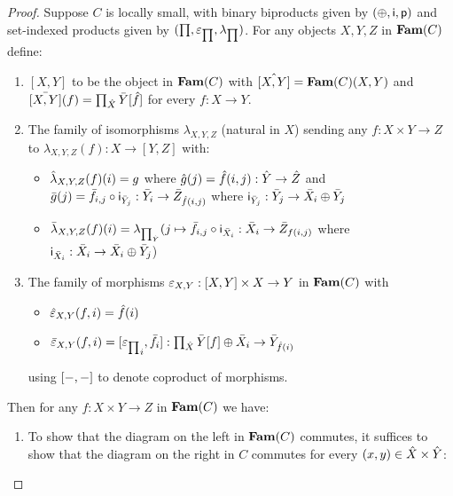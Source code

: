 \begin{proof}
Suppose $C$ is locally small, with binary biproducts given by $(\oplus,\mathsf{i},\mathsf{p})$ and set-indexed products
given by $(\prod,\varepsilon_{\prod},\lambda_{\prod})$. For any objects $X, Y, Z$ in $\mathbf{Fam}(C)$ define:

\begin{enumerate}
\item $[X, Y]$ to be the object in $\mathbf{Fam}(C)$ with $\hat{[X,Y]} = \mathbf{Fam}(C)(X,Y)$ and $\bar{[X, Y]}(f) =
\prod_{\hat{X}}\bar{Y}[\hat{f}]$ for every $f: X \to Y$.
\item The family of isomorphisms $\lambda_{X,Y,Z}$ (natural in $X$) sending any $f: X \times Y \to Z$ to
$\lambda_{X,Y,Z}(f): X \to [Y, Z]$ with:
\begin{itemize}
\item $\hat{\lambda}_{X,Y,Z}(f)(i) = g$ where $\hat{g}(j) = \hat{f}(i, j): \hat{Y} \to \hat{Z}$ and
$\bar{g}(j) = \bar{f}_{i,j} \circ \mathsf{i}_{\bar{Y}_j}: \bar{Y}_i \to \bar{Z}_{\hat{f}(i, j)}$ where
$\mathsf{i}_{\bar{Y}_j}: \bar{Y}_j \to \bar{X}_i \oplus \bar{Y}_j$
\item $\bar{\lambda}_{X,Y,Z}(f)(i) = \lambda_{\prod_{\hat{Y}}}(j \mapsto \bar{f}_{i, j} \circ
\mathsf{i}_{\bar{X}_i}: \bar{X}_i \to \bar{Z}_{f(i,j)}$ where $\mathsf{i}_{\bar{X}_i}: \bar{X}_i \to \bar{X}_i
\oplus \bar{Y}_j$)
\end{itemize}
\item The family of morphisms $\varepsilon_{X,Y}: [X, Y] \times X \to Y$ in $\mathbf{Fam}(C)$ with
\begin{itemize}
\item $\hat{\varepsilon}_{X,Y}(f, i) = \hat{f}(i)$
\item $\bar{\varepsilon}_{X,Y}(f, i) = [{\varepsilon_{\prod}}_i, \bar{f}_i]:
\prod_{\hat{X}}\bar{Y}[f] \oplus \bar{X}_i \to \bar{Y}_{\hat{f}(i)}$
\end{itemize}
using $[-, -]$ to denote coproduct of morphisms.
\end{enumerate}
Then for any $f: X \times Y \to Z$ in $\mathbf{Fam}(C)$ we have:
\begin{enumerate}
\item To show that the diagram on the left in $\mathbf{Fam}(C)$ commutes, it suffices to show that the diagram on the
right in $C$ commutes for every $(x, y) \in \hat{X} \times \hat{Y}$:


\end{enumerate}
\end{proof}

